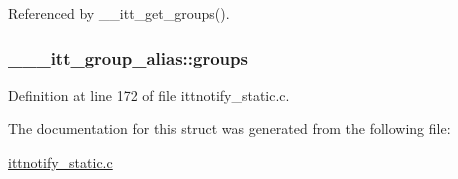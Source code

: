 Referenced by \-\_\-\-\_\-itt\-\_\-get\-\_\-groups().

\hypertarget{struct______itt__group__alias_a6ea6f53acf7e9d24b01b81243ecd94d6}{
\subsubsection[{groups}]{ \-\_\-\-\_\-\-\_\-itt\-\_\-group\-\_\-alias\-::groups}}\label{struct______itt__group__alias_a6ea6f53acf7e9d24b01b81243ecd94d6}


Definition at line 172 of file ittnotify\-\_\-static.\-c.



The documentation for this struct was generated from the following file\-:\begin{DoxyCompactItemize}
\item 
\hyperlink{ittnotify__static_8c}{ittnotify\-\_\-static.\-c}\end{DoxyCompactItemize}
